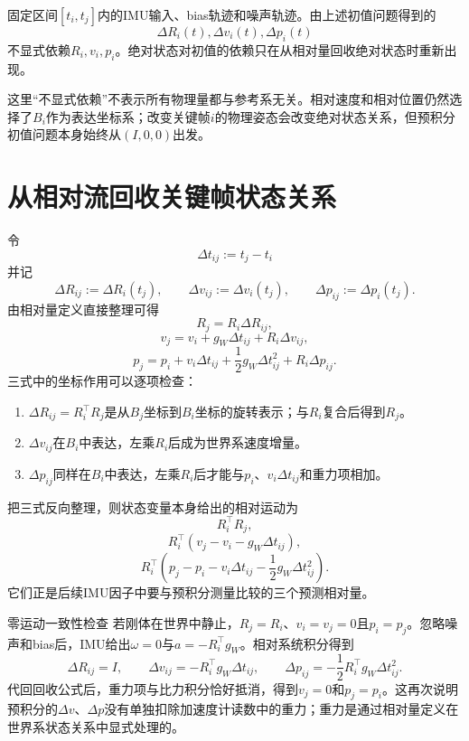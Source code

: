 \begin{proposition}[相对流消去关键帧初始导航状态]
固定区间$[t_i,t_j]$内的IMU输入、bias轨迹和噪声轨迹。由上述初值问题得到的
\[
    \Delta R_i(t),\Delta v_i(t),\Delta p_i(t)
\]
不显式依赖$R_i,v_i,p_i$。绝对状态对初值的依赖只在从相对量回收绝对状态时重新出现。
\end{proposition}

这里“不显式依赖”不表示所有物理量都与参考系无关。相对速度和相对位置仍然选择了$B_i$作为表达坐标系；改变关键帧$i$的物理姿态会改变绝对状态关系，但预积分初值问题本身始终从$(I,0,0)$出发。


\section{从相对流回收关键帧状态关系}

令
\[
    \Delta t_{ij}:=t_j-t_i
\]
并记
\[
    \Delta R_{ij}:=\Delta R_i(t_j),
    \qquad
    \Delta v_{ij}:=\Delta v_i(t_j),
    \qquad
    \Delta p_{ij}:=\Delta p_i(t_j).
\]
由相对量定义直接整理可得
\[
\boxed{
    R_j=R_i\Delta R_{ij},
}
\]
\[
\boxed{
    v_j=v_i+g_W\Delta t_{ij}+R_i\Delta v_{ij},
}
\]
\[
\boxed{
    p_j=p_i+v_i\Delta t_{ij}
    +\frac12g_W\Delta t_{ij}^2
    +R_i\Delta p_{ij}.
}
\]
三式中的坐标作用可以逐项检查：
\begin{enumerate}
    \item $\Delta R_{ij}=R_i^\top R_j$是从$B_j$坐标到$B_i$坐标的旋转表示；与$R_i$复合后得到$R_j$。
    \item $\Delta v_{ij}$在$B_i$中表达，左乘$R_i$后成为世界系速度增量。
    \item $\Delta p_{ij}$同样在$B_i$中表达，左乘$R_i$后才能与$p_i$、$v_i\Delta t_{ij}$和重力项相加。
\end{enumerate}

把三式反向整理，则状态变量本身给出的相对运动为
\[
    R_i^\top R_j,
\]
\[
    R_i^\top(v_j-v_i-g_W\Delta t_{ij}),
\]
\[
    R_i^\top
    \left(
        p_j-p_i-v_i\Delta t_{ij}
        -\frac12g_W\Delta t_{ij}^2
    \right).
\]
它们正是后续IMU因子中要与预积分测量比较的三个预测相对量。

\begin{imucase}{零运动一致性检查}
若刚体在世界中静止，$R_j=R_i$、$v_i=v_j=0$且$p_i=p_j$。忽略噪声和bias后，IMU给出$\omega=0$与$a=-R_i^\top g_W$。相对系统积分得到
\[
    \Delta R_{ij}=I,
    \qquad
    \Delta v_{ij}=-R_i^\top g_W\Delta t_{ij},
    \qquad
    \Delta p_{ij}=-\frac12R_i^\top g_W\Delta t_{ij}^2.
\]
代回回收公式后，重力项与比力积分恰好抵消，得到$v_j=0$和$p_j=p_i$。这再次说明预积分的$\Delta v$、$\Delta p$没有单独扣除加速度计读数中的重力；重力是通过相对量定义在世界系状态关系中显式处理的。
\end{imucase}

